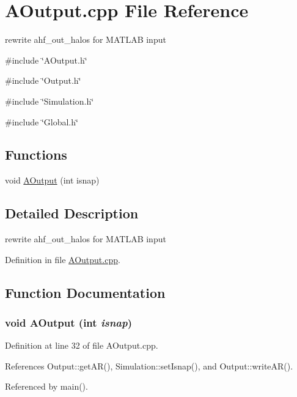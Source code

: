 \section{AOutput.cpp File Reference}
\label{AOutput_8cpp}


rewrite ahf\_\-out\_\-halos for MATLAB input  


{\ttfamily \#include \char`\"{}AOutput.h\char`\"{}}\par
{\ttfamily \#include \char`\"{}Output.h\char`\"{}}\par
{\ttfamily \#include \char`\"{}Simulation.h\char`\"{}}\par
{\ttfamily \#include \char`\"{}Global.h\char`\"{}}\par
\subsection*{Functions}
\begin{DoxyCompactItemize}
\item 
void \hyperlink{AOutput_8cpp_ad22eec91656af58e2e2b3be8f346233a}{AOutput} (int isnap)
\end{DoxyCompactItemize}


\subsection{Detailed Description}
rewrite ahf\_\-out\_\-halos for MATLAB input 

Definition in file \hyperlink{AOutput_8cpp_source}{AOutput.cpp}.



\subsection{Function Documentation}
\subsubsection[{AOutput}]{\setlength{\rightskip}{0pt plus 5cm}void AOutput (int {\em isnap})}\label{AOutput_8cpp_ad22eec91656af58e2e2b3be8f346233a}


Definition at line 32 of file AOutput.cpp.



References Output::getAR(), Simulation::setIsnap(), and Output::writeAR().



Referenced by main().

